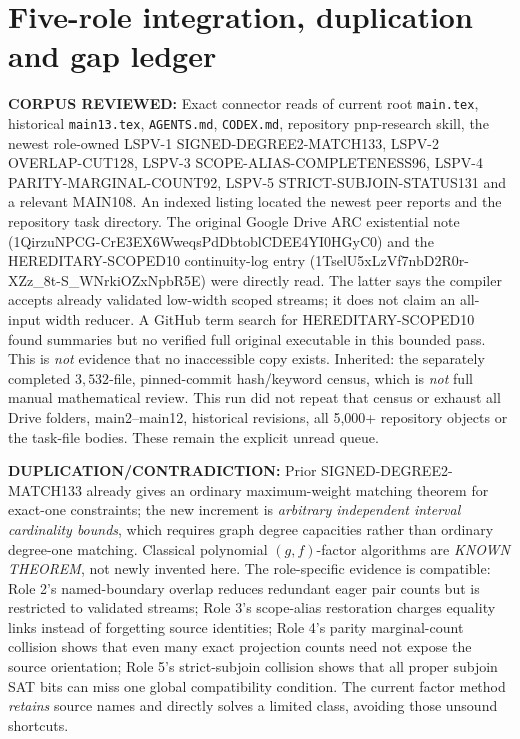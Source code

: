 \documentclass[11pt]{article}
\begin{document}
\section{Five-role integration, duplication and gap ledger}
\textbf{CORPUS REVIEWED:} Exact connector reads of current root
\texttt{main.tex}, historical \texttt{main13.tex}, \texttt{AGENTS.md},
\texttt{CODEX.md}, repository pnp-research skill, the newest role-owned
LSPV-1 SIGNED-DEGREE2-MATCH133, LSPV-2 OVERLAP-CUT128, LSPV-3
SCOPE-ALIAS-COMPLETENESS96, LSPV-4 PARITY-MARGINAL-COUNT92, LSPV-5
STRICT-SUBJOIN-STATUS131 and a relevant MAIN108.
An indexed listing located the newest peer reports and the repository
task directory. The original Google Drive ARC existential note
(1QirzuNPCG-CrE3EX6WweqsPdDbtoblCDEE4YI0HGyC0) and the
HEREDITARY-SCOPED10 continuity-log entry
(1TselU5xLzVf7nbD2R0r-XZz_8t-S_WNrkiOZxNpbR5E) were directly read.
The latter says the compiler accepts already validated low-width scoped
streams; it does not claim an all-input width reducer. A GitHub term
search for HEREDITARY-SCOPED10 found summaries but no verified full
original executable in this bounded pass. This is \emph{not} evidence
that no inaccessible copy exists.
Inherited: the separately completed \(3,532\)-file, pinned-commit
hash/keyword census, which is \emph{not} full manual mathematical review.
This run did not repeat that census or exhaust all Drive folders,
main2--main12, historical revisions, all 5,000+ repository objects or
the task-file bodies. These remain the explicit unread queue.

\textbf{DUPLICATION/CONTRADICTION:}
Prior SIGNED-DEGREE2-MATCH133 already gives an ordinary
maximum-weight matching theorem for exact-one constraints;
the new increment is \emph{arbitrary independent interval cardinality
bounds}, which requires graph degree capacities rather than ordinary
degree-one matching. Classical polynomial \((g,f)\)-factor algorithms
are \emph{KNOWN THEOREM}, not newly invented here.
The role-specific evidence is compatible: Role 2's named-boundary
overlap reduces redundant eager pair counts but is restricted to
validated streams; Role 3's scope-alias restoration charges equality
links instead of forgetting source identities; Role 4's parity
marginal-count collision shows that even many exact projection counts
need not expose the source orientation; Role 5's strict-subjoin
collision shows that all proper subjoin SAT bits can miss one global
compatibility condition. The current factor method \emph{retains}
source names and directly solves a limited class, avoiding those
unsound shortcuts.
\end{document}
